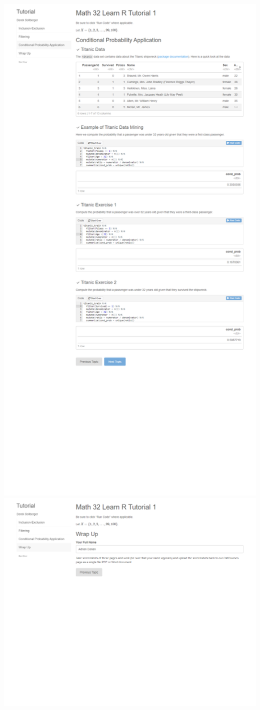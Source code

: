 \documentclass[a4paper]{article}
\begin{document}
\includegraphics[scale=0.4]{page_3.png} \\
\includegraphics[scale=0.4]{page_4.png} \\
    
\end{document}
